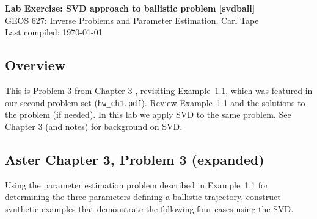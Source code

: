 \documentclass[11pt,titlepage,fleqn]{article}
\begin{document}

\begin{spacing}{1.2}
\centering
{\large \bf Lab Exercise: SVD approach to ballistic problem [svdball]} \\
GEOS 627: Inverse Problems and Parameter Estimation, Carl Tape \\
Last compiled: \today
\end{spacing}


\subsection*{Overview}

This is Problem 3 from Chapter 3 \citep{AsterE2}, revisiting Example~1.1, which was featured in our second problem set (\verb+hw_ch1.pdf+). Review Example~1.1 and the solutions to the problem (if needed). In this lab we apply SVD to the same problem. See Chapter 3 (and notes) for background on SVD.


\subsection*{Aster Chapter 3, Problem 3 (expanded)}

Using the parameter estimation problem described in Example~1.1 for determining the three parameters defining a ballistic trajectory, construct synthetic examples that demonstrate the following four cases using the SVD.
\end{document}
